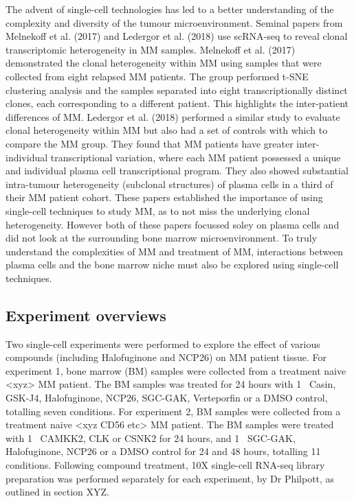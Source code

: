 The advent of single-cell technologies has led to a better understanding of the complexity and diversity of the tumour microenvironment.
Seminal papers from Melnekoff et al. (2017)\cite{melnekoff2017single} and Ledergor et al. (2018)\cite{ledergor2018single} use scRNA-seq to reveal clonal transcriptomic heterogeneity in MM samples.
Melnekoff et al. (2017) demonstrated the clonal heterogeneity within MM using samples that were collected from eight relapsed MM patients.
The group performed t-SNE clustering analysis and the samples separated into eight transcriptionally distinct clones, each corresponding to a different patient.
This highlights the inter-patient differences of MM\@.
Ledergor et al. (2018) performed a similar study to evaluate clonal heterogeneity within MM but also had a set of controls with which to compare the MM group.
They found that MM patients have greater inter-individual transcriptional variation, where each MM patient possessed a unique and individual plasma cell transcriptional program.
They also showed substantial intra-tumour heterogeneity (subclonal structures) of plasma cells in a third of their MM patient cohort.
These papers established the importance of using single-cell techniques to study MM, as to not miss the underlying clonal heterogeneity.
However both of these papers focussed soley on plasma cells and did not look at the surrounding bone marrow microenvironment.
To truly understand the complexities of MM and treatment of MM, interactions between plasma cells and the bone marrow niche must also be explored using single-cell techniques.


\subsection{Experiment overviews}
Two single-cell experiments were performed to explore the effect of various compounds (including Halofuginone and NCP26) on MM patient tissue.
For experiment 1, bone marrow (BM) samples were collected from a treatment naive <xyz> MM patient.
The BM samples was treated for 24 hours with 1\si{\micro\Molar} Casin, GSK-J4, Halofuginone, NCP26, SGC-GAK, Verteporfin or a DMSO control, totalling seven conditions.
For experiment 2, BM samples were collected from a treatment naive <xyz CD56 etc> MM patient.
The BM samples were treated with 1\si{\micro\Molar} CAMKK2, CLK or CSNK2 for 24 hours, and 1\si{\micro\Molar} SGC-GAK, Halofuginone, NCP26 or a DMSO control for 24 and 48 hours, totalling 11 conditions.
Following compound treatment, 10X single-cell RNA-seq library preparation was performed separately for each experiment, by Dr Philpott, as outlined in section XYZ.

